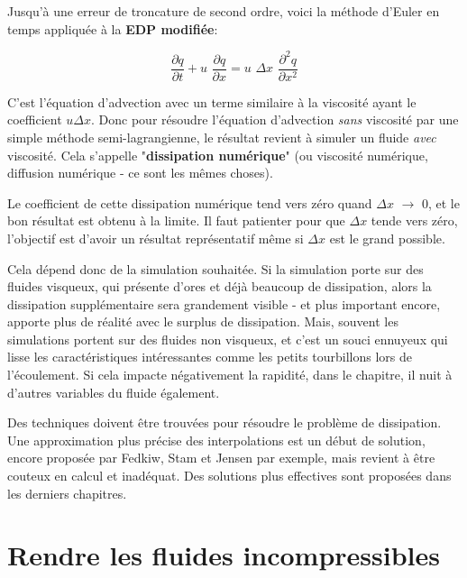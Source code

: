 \documentclass[11pt]{report}
\begin{document}
Jusqu'à une erreur de troncature de second ordre, voici la méthode d'Euler en temps appliquée à la \textbf{EDP modifiée}:

\begin{equation}
\frac{\partial q}{\partial t} + u \,\, \frac{\partial q}{\partial x} = u \,\, \Delta x \,\,\frac{\partial^2 q}{\partial x^2}
\end{equation}

C'est l'équation d'advection avec un terme similaire à la viscosité ayant le coefficient $u \Delta x$. Donc pour résoudre l'équation d'advection \textit{sans}  viscosité par une simple méthode semi-lagrangienne, le résultat revient à simuler un fluide \textit{avec} viscosité. Cela s'appelle "\textbf{dissipation numérique}" (ou viscosité numérique, diffusion numérique - ce sont les mêmes choses).\newline

Le coefficient de cette dissipation numérique tend vers zéro quand $\Delta x \,\, \rightarrow \,\, 0$, et le bon résultat est obtenu à la limite. Il faut patienter pour que $\Delta x$ tende vers zéro, l'objectif est d'avoir un résultat représentatif même si $\Delta x$ est le grand possible.\newline

Cela dépend donc de la simulation souhaitée. Si la simulation porte sur des fluides visqueux, qui présente d'ores et déjà beaucoup de dissipation, alors la dissipation supplémentaire sera grandement visible - et plus important encore, apporte plus de réalité avec le surplus de dissipation. Mais, souvent les simulations portent sur des fluides non visqueux, et c'est un souci ennuyeux qui lisse les caractéristiques intéressantes comme les petits tourbillons lors de l'écoulement. Si cela impacte négativement la rapidité, dans le chapitre, il nuit à d'autres variables du fluide également. \newline

Des techniques doivent être trouvées pour résoudre le problème de dissipation. Une approximation plus précise des interpolations est un début de solution, encore proposée par Fedkiw, Stam et Jensen \cite{fedkiw-stam-jensen-01} par exemple, mais revient à être couteux en calcul et inadéquat. Des solutions plus effectives sont proposées dans les derniers chapitres.

\chapter{Rendre les fluides incompressibles}
\end{document}

